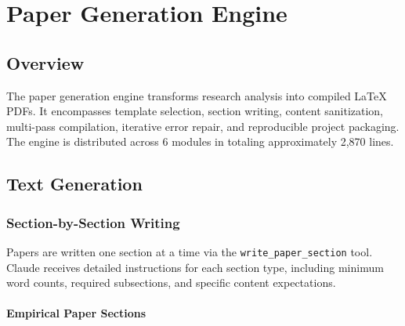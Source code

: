 \chapter{Paper Generation Engine}
\label{ch:paper-engine}

\section{Overview}
\label{sec:paper:overview}

The paper generation engine transforms research analysis into compiled \LaTeX{} PDFs.
It encompasses template selection, section writing, content sanitization, multi-pass compilation, iterative error repair, and reproducible project packaging.
The engine is distributed across 6 modules in  totaling approximately 2,870 lines.

\section{Text Generation}
\label{sec:paper:text}

\subsection{Section-by-Section Writing}

Papers are written one section at a time via the \texttt{write\_paper\_section} tool.
Claude receives detailed instructions for each section type, including minimum word counts, required subsections, and specific content expectations.

\subsubsection{Empirical Paper Sections}

